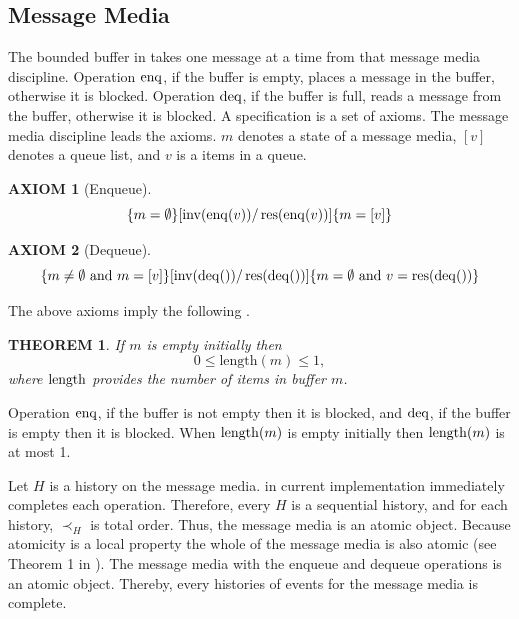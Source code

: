 \documentclass[12pt,a4paper,titlepage]{article}
\makeatletter
\newenvironment{proof}[1][\proofname]{\par
  \normalfont
  \topsep6\p@\@plus6\p@ \trivlist
  \item[\hskip\labelsep{\bfseries #1}\@addpunct{\bfseries.}]\ignorespaces
}{%
  \endtrivlist
}
\newcommand{\proofname}{Proof Sketch}
\theoremstyle{break}
\newtheorem{axiom}{AXIOM}[section]
\newtheorem{theorem}{THEOREM}[section]
\makeatother
\begin{document}
\subsection{\NHK Message Media}
The bounded buffer in \NHK takes one message at a time from that message media discipline.
Operation \(\mathop{\mathrm{enq}}\nolimits\), if the buffer is empty, places a message in the buffer, otherwise it is blocked.
Operation \(\mathop{\mathrm{deq}}\nolimits\), if the buffer is full, reads a message from the buffer, otherwise it is blocked.
A specification is a set of axioms.
The message media discipline leads the axioms.
$m$ denotes a state of a message media, \([v]\) denotes a queue list, and $v$ is a items in a queue.
  \begin{axiom}[Enqueue]\label{ax:enque}
    \begin{displaymath}
\{m=\emptyset\}[\mathop{\mathrm{inv}}\nolimits(\mathop{\mathrm{enq}}\nolimits(v))/\mathop{\mathrm{res}}\nolimits(\mathop{\mathrm{enq}}\nolimits(v))]\{m=[v]\}
    \end{displaymath}
  \end{axiom}
  \begin{axiom}[Dequeue]\label{ax:deque}
    \begin{displaymath}
\{m\neq\emptyset\mbox{ and }m=[v]\}[\mathop{\mathrm{inv}}\nolimits(\mathop{\mathrm{deq}}\nolimits())/\mathop{\mathrm{res}}\nolimits(\mathop{\mathrm{deq}}\nolimits())]\{m=\emptyset\mbox{ and }v=\mathop{\mathrm{res}}\nolimits(\mathop{\mathrm{deq}}\nolimits())\}
    \end{displaymath}
  \end{axiom}
The above axioms imply the following .
  \begin{theorem}\label{th:bound}
If $m$ is empty initially then
    \begin{displaymath}
0\leq\mbox{length}(m)\leq 1,
    \end{displaymath}
where \(\mathop{\mathrm{length}}\nolimits\) provides the number of items in buffer $m$.
  \end{theorem}
  \begin{proof}
Operation \(\mathop{\mathrm{enq}}\nolimits\), if the buffer is not empty then it is blocked, and \(\mathop{\mathrm{deq}}\nolimits\), if the buffer is empty then it is blocked.
When \(\mathop{\mathrm{length}}\nolimits(m)\) is empty initially then \(\mathop{\mathrm{length}}\nolimits(m)\) is at most 1.
\QED
  \end{proof}

Let $H$ is a history on the message media.
\NHK in current implementation immediately completes each operation.
Therefore, every $H$ is a sequential history, and for each history, \(\prec_{H}\) is total order.
Thus, the message media is an atomic object.
Because atomicity is a local property the whole of the message media is also atomic (see Theorem 1 in \cite{Herlihy:1987}).
The message media with the enqueue and dequeue operations is an atomic object.
Thereby, every histories of events for the message media is complete.
%
%
\end{document}
